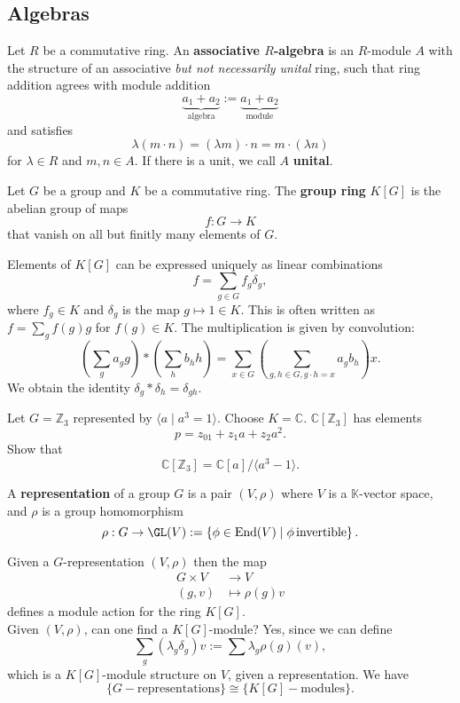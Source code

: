\subsection*{Algebras}
\begin{definition}
    Let $R$ be a commutative ring. An \textbf{associative $R$-algebra} is an $R$-module $A$ with the structure of an associative \emph{but not necessarily unital} ring, such that ring addition agrees with module addition \[
        \underbrace{a_1 + a_2}_\text{algebra} := \underbrace{a_1 + a_2}_\text{module}
    \] and satisfies \[
    \lambda(m\cdot n)=(\lambda m) \cdot n = m \cdot (\lambda n)
    \] for $\lambda \in R$ and $m,n \in A$. If there is a unit, we call $A$ \textbf{unital}.
\end{definition}
\begin{definition}
    Let $G$ be a group and $K$ be a commutative ring. The \textbf{group ring} $K[G]$ is the abelian group of maps \[
    f: G \to K
    \] that vanish on all but finitly many elements of $G$.
\end{definition}
\begin{note}
    Elements of $K[G]$ can be expressed uniquely as linear combinations \[
        f = \sum_{g \in G} f_g \delta_g
    ,\] where $f_g \in K$ and $\delta_g$ is the map $g \mapsto 1 \in K$. This is often written as $f=\sum_g f(g)g$ for $f(g)\in K$. The multiplication is given by convolution:
    \[
        \left( \sum_g a_g g\right)\ast \left( \sum_h b_h h\right) = \sum_{x \in G} \left( \sum_{g,h \in G, g \cdot h =x} a_g b_h \right)x
    .\] We obtain the identity $\delta_g \ast \delta_h = \delta_{gh}$.
\end{note}
\begin{ex}
    Let $G = \mathbb{Z}_3$ represented by $\langle a \mid a^3=1 \rangle$. Choose $K = \mathbb{C}$. $\mathbb{C}[\mathbb{Z}_3]$ has elements \[
    p = z_01 + z_1 a + z_2 a^2
    .\] Show that \[
    \mathbb{C}[\mathbb{Z}_3]=\mathbb{C}[a] / \langle a^3 -1 \rangle
    .\] 
\end{ex}
\begin{definition}[Representation]
    A \textbf{representation} of a group $G$ is a pair $(V,\rho)$ where $V$ is a $\mathbb{K}$-vector space, and $\rho$ is a group homomorphism \[
        \rho: G \to \GL(V):=\left\{\phi \in \End(V) \mid \phi \, \text{invertible}\right\} 
    .\] 
\end{definition}
\begin{remark}
   Given a $G$-representation $(V, \rho)$ then the map 
   \begin{align*}
       G \times V &\to V\\
       (g,v) &\mapsto \rho(g)v
   \end{align*} defines a module action for the ring $K[G]$.\\
   Given $(V,\rho)$, can one find a $K[G]$-module? Yes, since we can define \[
   \sum_g (\lambda_g \delta_g)v:=\sum \lambda_g \rho(g)(v)
,\] which is a $K[G]$-module structure on $V$, given a representation. We have \[
\{ G-\text{representations}\} \cong \{ K[G]-\text{modules}\}
.\] 
\end{remark}
